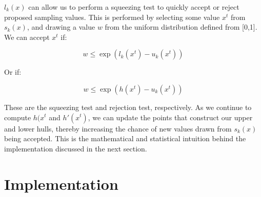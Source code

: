 \documentclass[12pt, oneside]{article}
\begin{document}
\(l_k(x) \) can allow us to perform a squeezing test to quickly accept or reject proposed sampling values.  This is performed by selecting some value \(x^t\) from \(s_k(x)\), and drawing a value \(w\) from the uniform distribution defined from [0,1].  We can accept \(x^t\) if:

\[ w \le \exp(l_k(x^t) - u_k(x^t)) \]

Or if:

\[ w \le \exp(h(x^t) - u_k(x^t)) \]

These are the squeezing test and rejection test, respectively.  As we continue to compute \(h(x^t\) and \(h'(x^t)\), we can update the points that construct our upper and lower hulls, thereby increasing the chance of new values drawn from \(s_k(x)\) being accepted.  This is the mathematical and statistical intuition behind the implementation discussed in the next section.

\section{Implementation}
\end{document}
